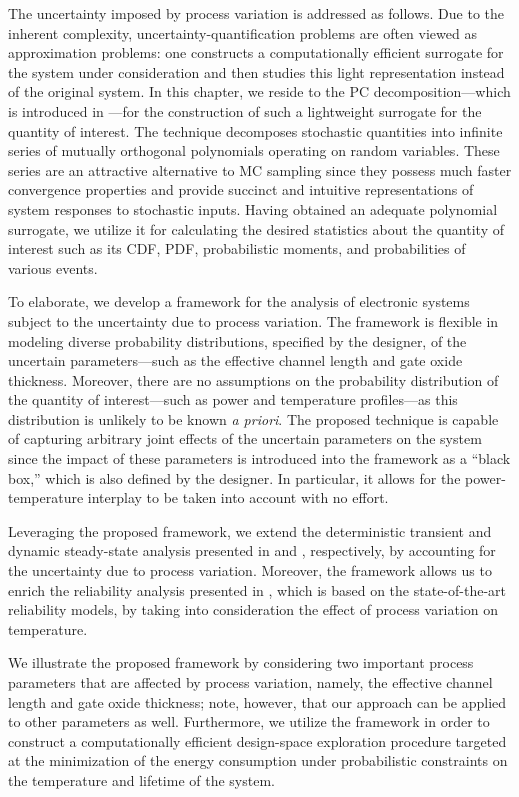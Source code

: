 The uncertainty imposed by process variation is addressed as follows. Due to the
inherent complexity, uncertainty-quantification problems are often viewed as
approximation problems: one constructs a computationally efficient surrogate for
the system under consideration and then studies this light representation
instead of the original system. In this chapter, we reside to the \ac{PC}
decomposition---which is introduced in ---for the
construction of such a lightweight surrogate for the quantity of interest. The
technique decomposes stochastic quantities into infinite series of mutually
orthogonal polynomials operating on random variables. These series are an
attractive alternative to \ac{MC} sampling since they possess much faster
convergence properties and provide succinct and intuitive representations of
system responses to stochastic inputs. Having obtained an adequate polynomial
surrogate, we utilize it for calculating the desired statistics about the
quantity of interest such as its \ac{CDF}, \ac{PDF}, probabilistic moments, and
probabilities of various events.

To elaborate, we develop a framework for the analysis of electronic systems
subject to the uncertainty due to process variation. The framework is flexible
in modeling diverse probability distributions, specified by the designer, of the
uncertain parameters---such as the effective channel length and gate oxide
thickness. Moreover, there are no assumptions on the probability distribution of
the quantity of interest---such as power and temperature profiles---as this
distribution is unlikely to be known \emph{a priori}. The proposed technique is
capable of capturing arbitrary joint effects of the uncertain parameters on the
system since the impact of these parameters is introduced into the framework as
a ``black box,'' which is also defined by the designer. In particular, it allows
for the power-temperature interplay to be taken into account with no effort.

Leveraging the proposed framework, we extend the deterministic transient and
dynamic steady-state analysis presented in  and
, respectively, by accounting for the
uncertainty due to process variation. Moreover, the framework allows us to
enrich the reliability analysis presented in , which
is based on the state-of-the-art reliability models, by taking into
consideration the effect of process variation on temperature.

We illustrate the proposed framework by considering two important process
parameters that are affected by process variation, namely, the effective channel
length and gate oxide thickness; note, however, that our approach can be applied
to other parameters as well. Furthermore, we utilize the framework in order to
construct a computationally efficient design-space exploration procedure
targeted at the minimization of the energy consumption under probabilistic
constraints on the temperature and lifetime of the system.
